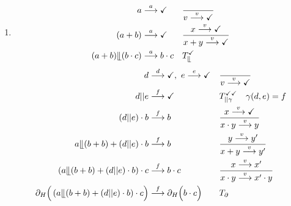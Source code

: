 \documentclass[a4paper]{scrartcl}
\newcommand{\too}{\longrightarrow}
\begin{document}
\begin{enumerate}
    \item
        \begin{align}
                a &\stackrel{a}{\too} \checkmark & &\frac{}{v \stackrel{v}{\too} \checkmark} \\
                (a + b) &\stackrel{a}{\too} \checkmark & &\frac{x \stackrel{v}{\too} \checkmark}{x + y \stackrel{v}{\too} \checkmark} \\
                (a + b) \llfloor (b \cdot c) &\stackrel{a}{\too} b \cdot c & &T_\llfloor^\checkmark \\
        \end{align}
        \begin{align}
                d &\stackrel{d}{\too} \checkmark ,\ e \stackrel{e}{\too} \checkmark & &\frac{}{v \stackrel{v}{\too} \checkmark} \\
                d||e &\stackrel{f}{\too} \checkmark & &T_{||\gamma}^{\checkmark\checkmark} \quad \gamma(d,e) = f \\
                (d||e) \cdot b &\stackrel{f}{\too} b & &\frac{x \stackrel{v}{\too} \checkmark}{x \cdot y \stackrel{v}{\too} y} \\
                a \llfloor (b + b) + (d||e) \cdot b &\stackrel{f}{\too} b & &\frac{y \stackrel{v}{\too} y'}{x + y \stackrel{v}{\too} y'} \\
                \left( a \llfloor (b + b) + (d||e) \cdot b \right) \cdot c &\stackrel{f}{\too} b \cdot c & &\frac{x \stackrel{v}{\too} x'}{x \cdot y \stackrel{v}{\too} x' \cdot y} \\
                \partial_H \Big( \left( a \llfloor (b + b) + (d||e) \cdot b \right) \cdot c \Big) &\stackrel{f}{\too} \partial_H \Big( b \cdot c \Big) & &T_\partial
        \end{align}


\end{enumerate}
\end{document}
